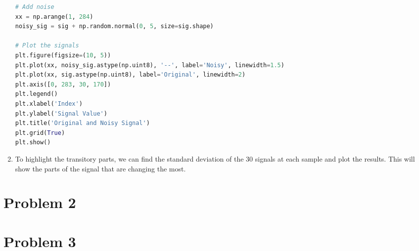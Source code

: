 \documentclass{article}
\begin{document}
\begin{enumerate}[label=\alph*.]
\begin{lstlisting}[language=Python, label={code:p1}, caption={Python code generated by LLM}]
# Add noise
xx = np.arange(1, 284)
noisy_sig = sig + np.random.normal(0, 5, size=sig.shape)

# Plot the signals
plt.figure(figsize=(10, 5))
plt.plot(xx, noisy_sig.astype(np.uint8), '--', label='Noisy', linewidth=1.5)
plt.plot(xx, sig.astype(np.uint8), label='Original', linewidth=2)
plt.axis([0, 283, 30, 170])
plt.legend()
plt.xlabel('Index')
plt.ylabel('Signal Value')
plt.title('Original and Noisy Signal')
plt.grid(True)
plt.show()
    \end{lstlisting}

\item To highlight the transitory parts, we can find the standard deviation of the 30 signals at each sample and plot the results. This will show the parts of the signal that are changing the most.
\end{enumerate}

\section{Problem 2}

\section{Problem 3}
\end{document}
